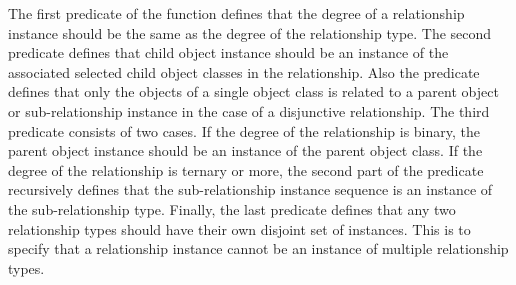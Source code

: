 \documentclass{entcs}
\begin{document}
The first predicate of the function defines that the degree of a
relationship instance should be the same as the degree of the
relationship type. The second predicate defines that child object
instance should be an instance of the associated selected child
object classes in the relationship. Also the predicate defines
that only the objects of a single object class is related to a
parent object or sub-relationship instance in the case of a
disjunctive relationship. The third predicate consists of two
cases. If the degree of the relationship is binary, the parent
object instance should be an instance of the parent object class.
If the degree of the relationship is ternary or more, the second
part of the predicate recursively defines that the
sub-relationship instance sequence is an instance of the
sub-relationship type. Finally, the last predicate defines that
any two relationship types should have their own disjoint set of
instances. This is to specify that a relationship instance cannot
be an instance of multiple relationship types.
\end{document}
